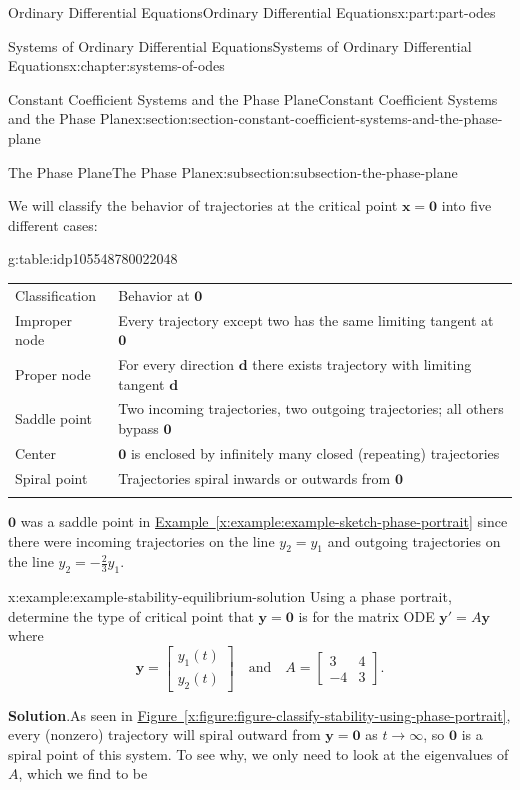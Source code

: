 \documentclass[oneside,10pt,]{book}
\newcommand{\blocktitlefont}{\relax}
\newcommand{\tabularfont}{\relax}
\newcommand{\xreffont}{\relax}
\numberwithin{equation}{part}
\newcommand{\hrulethick} {\noalign{\hrule height 0.11em}}
\renewcommand{\vec}[1]{\mathbf{#1}}
\newcommand{\amp}{&}
\begin{document}
\begin{partptx}{Ordinary Differential Equations}{}{Ordinary Differential Equations}{}{}{x:part:part-odes}
\begin{chapterptx}{Systems of Ordinary Differential Equations}{}{Systems of Ordinary Differential Equations}{}{}{x:chapter:systems-of-odes}
\begin{sectionptx}{Constant Coefficient Systems and the Phase Plane}{}{Constant Coefficient Systems and the Phase Plane}{}{}{x:section:section-constant-coefficient-systems-and-the-phase-plane}
\begin{subsectionptx}{The Phase Plane}{}{The Phase Plane}{}{}{x:subsection:subsection-the-phase-plane}
\par
We will classify the behavior of trajectories at the critical point \(\vec{x} = \vec{0}\) into five different cases:%
\begin{tableptx}{\textbf{}}{g:table:idp105548780022048}{}%
\centering%
{\tabularfont%
\begin{tabular}{ll}\hrulethick
Classification&Behavior at \(\vec{0}\)\tabularnewline\hrulethick
Improper node&Every trajectory except two has the same limiting tangent at \(\vec{0}\)\tabularnewline[0pt]
Proper node&For every direction \(\vec{d}\) there exists trajectory with limiting tangent \(\vec{d}\)\tabularnewline[0pt]
Saddle point&Two incoming trajectories, two outgoing trajectories; all others bypass \(\vec{0}\)\tabularnewline[0pt]
Center&\(\vec{0}\) is enclosed by infinitely many closed (repeating) trajectories\tabularnewline[0pt]
Spiral point&Trajectories spiral inwards or outwards from \(\vec{0}\)\tabularnewline\hrulethick
\end{tabular}
}%
\end{tableptx}%
\(\vec{0}\) was a saddle point in \hyperref[x:example:example-sketch-phase-portrait]{Example~{\xreffont\ref{x:example:example-sketch-phase-portrait}}} since there were incoming trajectories on the line \(y_{2} = y_{1}\) and outgoing trajectories on the line \(y_{2} = -\frac{2}{3}y_{1}\).%
\begin{example}{}{x:example:example-stability-equilibrium-solution}%
Using a phase portrait, determine the type of critical point that \(\vec{y} = \vec{0}\) is for the matrix ODE \(\vec{y}'=A\vec{y}\) where%
\begin{equation*}
\vec{y} = \begin{bmatrix}y_{1}(t) \\ y_{2}(t)\end{bmatrix}\quad\text{and}\quad A = \begin{bmatrix}3 \amp  4 \\ -4 \amp  3\end{bmatrix}.
\end{equation*}
%
\par\smallskip%
\noindent\textbf{\blocktitlefont Solution}.\hypertarget{g:solution:idp105548780032160}{}\quad{}As seen in \hyperref[x:figure:figure-classify-stability-using-phase-portrait]{Figure~{\xreffont\ref{x:figure:figure-classify-stability-using-phase-portrait}}}, every (nonzero) trajectory will spiral outward from \(\vec{y} = \vec{0}\) as \(t\to\infty\), so \(\vec{0}\) is a spiral point of this system. To see why, we only need to look at the eigenvalues of \(A\), which we find to be%

\end{example}
\end{subsectionptx}
\end{sectionptx}
\end{chapterptx}
\end{partptx}
\end{document}
